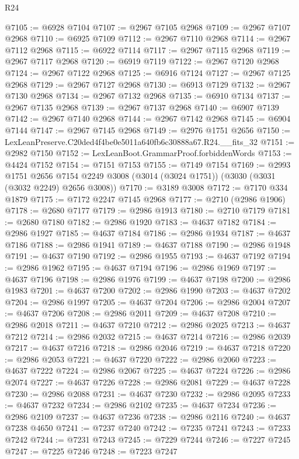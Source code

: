 \begin{lexlean}{R24}
\begin{coremodule}
@7105 := @6928 @7104
@7107 := @2967 @7105 @2968
@7109 := @2967 @7107 @2968
@7110 := @6925 @7109
@7112 := @2967 @7110 @2968
@7114 := @2967 @7112 @2968
@7115 := @6922 @7114
@7117 := @2967 @7115 @2968
@7119 := @2967 @7117 @2968
@7120 := @6919 @7119
@7122 := @2967 @7120 @2968
@7124 := @2967 @7122 @2968
@7125 := @6916 @7124
@7127 := @2967 @7125 @2968
@7129 := @2967 @7127 @2968
@7130 := @6913 @7129
@7132 := @2967 @7130 @2968
@7134 := @2967 @7132 @2968
@7135 := @6910 @7134
@7137 := @2967 @7135 @2968
@7139 := @2967 @7137 @2968
@7140 := @6907 @7139
@7142 := @2967 @7140 @2968
@7144 := @2967 @7142 @2968
@7145 := @6904 @7144
@7147 := @2967 @7145 @2968
@7149 := @2976 @1751 @2656
@7150 := LexLeanPreserve.C20ded4f4be0e5011a640fb6c30888a67.R24.__fits_32
@7151 := @2982 @7150
@7152 := LexLeanBoot.GrammarProof.forbiddenWords
@7153 := @4424 @7152
@7154 := @7151 @7153
@7155 := @7149 @7154
@7169 := @2993
    @1751
    @2656
    @7154
    @2249
    @3008
    (@3014 (@3024 @1751))
    (@3030 (@3031 (@3032 @2249) @2656 @3008))
@7170 := @3189 @3008
@7172 := @7170 @334 @1879
@7175 := @7172 @2247 @7145 @2968
@7177 := @2710 (@2986 @1906)
@7178 := @2680 @7177
@7179 := @2986 @1913
@7180 := @2710 @7179
@7181 := @2680 @7180
@7182 := @2986 @1920
@7183 := @4637 @7182
@7184 := @2986 @1927
@7185 := @4637 @7184
@7186 := @2986 @1934
@7187 := @4637 @7186
@7188 := @2986 @1941
@7189 := @4637 @7188
@7190 := @2986 @1948
@7191 := @4637 @7190
@7192 := @2986 @1955
@7193 := @4637 @7192
@7194 := @2986 @1962
@7195 := @4637 @7194
@7196 := @2986 @1969
@7197 := @4637 @7196
@7198 := @2986 @1976
@7199 := @4637 @7198
@7200 := @2986 @1983
@7201 := @4637 @7200
@7202 := @2986 @1990
@7203 := @4637 @7202
@7204 := @2986 @1997
@7205 := @4637 @7204
@7206 := @2986 @2004
@7207 := @4637 @7206
@7208 := @2986 @2011
@7209 := @4637 @7208
@7210 := @2986 @2018
@7211 := @4637 @7210
@7212 := @2986 @2025
@7213 := @4637 @7212
@7214 := @2986 @2032
@7215 := @4637 @7214
@7216 := @2986 @2039
@7217 := @4637 @7216
@7218 := @2986 @2046
@7219 := @4637 @7218
@7220 := @2986 @2053
@7221 := @4637 @7220
@7222 := @2986 @2060
@7223 := @4637 @7222
@7224 := @2986 @2067
@7225 := @4637 @7224
@7226 := @2986 @2074
@7227 := @4637 @7226
@7228 := @2986 @2081
@7229 := @4637 @7228
@7230 := @2986 @2088
@7231 := @4637 @7230
@7232 := @2986 @2095
@7233 := @4637 @7232
@7234 := @2986 @2102
@7235 := @4637 @7234
@7236 := @2986 @2109
@7237 := @4637 @7236
@7238 := @2986 @2116
@7240 := @4637 @7238 @4650
@7241 := @7237 @7240
@7242 := @7235 @7241
@7243 := @7233 @7242
@7244 := @7231 @7243
@7245 := @7229 @7244
@7246 := @7227 @7245
@7247 := @7225 @7246
@7248 := @7223 @7247

\end{coremodule}
\end{lexlean}
